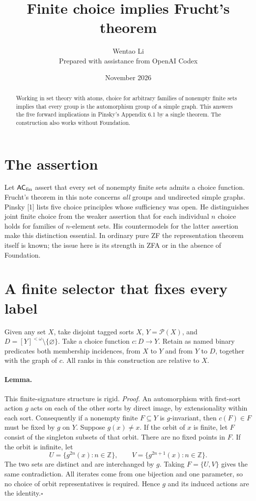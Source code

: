 \documentclass[11pt]{article}
\title{Finite choice implies Frucht's theorem}
\author{Wentao Li\\[2pt]\small Prepared with assistance from OpenAI Codex}
\date{November 2026}
\begin{document}
\maketitle
\begin{abstract}
Working in set theory with atoms, choice for arbitrary families of nonempty finite sets implies that every group is the automorphism group of a simple graph. This answers the five forward implications in Pinsky's Appendix 6.1 by a single theorem. The construction also works without Foundation.
\end{abstract}
\section{The assertion}
Let $\mathsf{AC}_{\rm fin}$ assert that every set of nonempty finite sets admits a choice function. Frucht's theorem in this note concerns \emph{all} groups and undirected simple graphs. Pinsky [1] lists five choice principles whose sufficiency was open. He distinguishes joint finite choice from the weaker assertion that for each individual $n$ choice holds for families of $n$-element sets. His countermodels for the latter assertion make this distinction essential. In ordinary pure ZF the representation theorem itself is known; the issue here is its strength in ZFA or in the absence of Foundation.
\section{A finite selector that fixes every label}
Given any set $X$, take disjoint tagged sorts $X$, $Y=\mathcal P(X)$, and $D=[Y]^{<\omega}\setminus\{\varnothing\}$. Take a choice function $c:D\to Y$. Retain as named binary predicates both membership incidences, from $X$ to $Y$ and from $Y$ to $D$, together with the graph of $c$. All ranks in this construction are relative to $X$.
\paragraph{Lemma.} This finite-signature structure is rigid.
\emph{Proof.} An automorphism with first-sort action $g$ acts on each of the other sorts by direct image, by extensionality within each sort. Consequently if a nonempty finite $F\subseteq Y$ is $g$-invariant, then $c(F)\in F$ must be fixed by $g$ on $Y$. Suppose $g(x)\ne x$. If the orbit of $x$ is finite, let $F$ consist of the singleton subsets of that orbit. There are no fixed points in $F$. If the orbit is infinite, let
\[
U=\{g^{2n}(x):n\in\mathbb Z\},\qquad V=\{g^{2n+1}(x):n\in\mathbb Z\}.
\]
The two sets are distinct and are interchanged by $g$. Taking $F=\{U,V\}$ gives the same contradiction. All iterates come from one bijection and one parameter, so no choice of orbit representatives is required. Hence $g$ and its induced actions are the identity.\hfill$\square$
\end{document}
